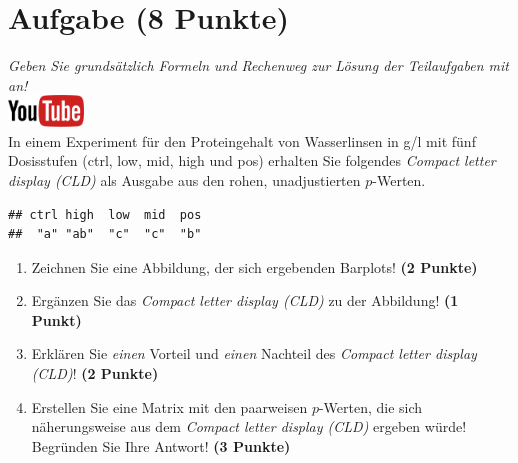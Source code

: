 \documentclass[a4paper, 9pt]{scrartcl}\usepackage[]{graphicx}\usepackage[]{xcolor}
\makeatletter
\newenvironment{kframe}{%
 \def\at@end@of@kframe{}%
 \ifinner\ifhmode%
  \def\at@end@of@kframe{\end{minipage}}%
  \begin{minipage}{\columnwidth}%
 \fi\fi%
 \def\FrameCommand##1{\hskip\@totalleftmargin \hskip-\fboxsep
 \colorbox{shadecolor}{##1}\hskip-\fboxsep
     \hskip-\linewidth \hskip-\@totalleftmargin \hskip\columnwidth}%
 \MakeFramed {\advance\hsize-\width
   \@totalleftmargin\z@ \linewidth\hsize
   \@setminipage}}%
 {\par\unskip\endMakeFramed%
 \at@end@of@kframe}
\newenvironment{knitrout}{}{} %
\makeatother
\begin{document}
\vspace{1Ex}

 
\clearpage

\section{Aufgabe \hfill (8 Punkte)}

\textit{Geben Sie grunds{\"a}tzlich Formeln und Rechenweg zur L{\"o}sung der
  Teilaufgaben mit an!} \\[1Ex]

 \hfill\href{https://youtu.be/xq29O8qDrg0}{\includegraphics[width =
   2cm]{img/youtube}}\\[1Ex]


 
 In einem Experiment f{\"u}r den Proteingehalt von Wasserlinsen in g/l mit f{\"u}nf
 Dosisstufen (ctrl, low, mid, high und pos) erhalten Sie folgendes \textit{Compact
   letter display (CLD)} als \Rlogo Ausgabe aus den rohen, unadjustierten
 $p$-Werten.



\begin{knitrout}
\color{fgcolor}\begin{kframe}
\begin{verbatim}
## ctrl high  low  mid  pos 
##  "a" "ab"  "c"  "c"  "b"
\end{verbatim}
\end{kframe}
\end{knitrout}

\begin{enumerate}
\item Zeichnen Sie eine Abbildung, der sich ergebenden Barplots! \textbf{(2 Punkte)}
\item Erg{\"a}nzen Sie das \textit{Compact letter display (CLD)} zu der
  Abbildung! \textbf{(1 Punkt)}
\item Erkl{\"a}ren Sie \textit{einen} Vorteil und \textit{einen} Nachteil des
  \textit{Compact letter display (CLD)}! \textbf{(2 Punkte)}
\item Erstellen Sie eine Matrix mit den paarweisen $p$-Werten, die sich
  n{\"a}herungsweise aus dem \textit{Compact letter display (CLD)} ergeben w{\"u}rde! Begr{\"u}nden Sie Ihre Antwort! \textbf{(3 Punkte)}
\end{enumerate}
\end{document}
